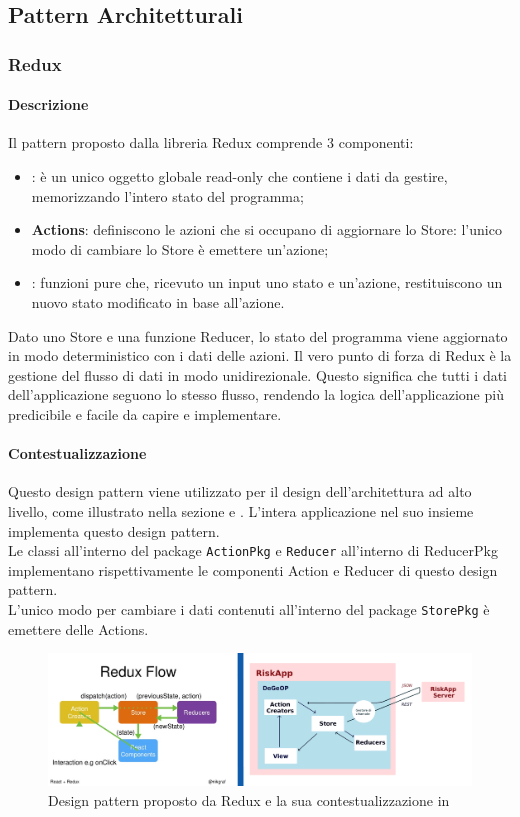 \newpage
\subsection{Pattern Architetturali}
\subsubsection{Redux}
\label{dp_redux} %
\paragraph{Descrizione}
Il pattern proposto dalla libreria Redux comprende 3 componenti:
\begin{itemize}
	\item \textbf{}: è un unico oggetto globale read-only che contiene i dati da gestire, memorizzando l'intero stato del programma;
	\item \textbf{Actions}: definiscono le azioni che si occupano di aggiornare lo Store: l'unico modo di cambiare lo Store è emettere un'azione;
	\item \textbf{}: funzioni pure che, ricevuto un input uno stato e un'azione, restituiscono un nuovo stato modificato in base all'azione.
\end{itemize}
Dato uno Store e una funzione Reducer, lo stato del programma viene aggiornato in modo deterministico con i dati delle azioni.
Il vero punto di forza di Redux è la gestione del flusso di dati in modo unidirezionale. Questo significa che tutti i dati dell'applicazione seguono lo stesso flusso, rendendo la logica dell'applicazione più predicibile e facile da capire e implementare.
\paragraph{Contestualizzazione}
Questo design pattern viene utilizzato per il design dell'architettura ad alto livello, come illustrato nella sezione  e . L'intera applicazione nel suo insieme implementa questo design pattern.
\\Le classi \texttt{} all'interno del package \texttt{ActionPkg} e \texttt{Reducer} all'interno di ReducerPkg implementano rispettivamente le componenti Action e Reducer di questo design pattern.
\\L'unico modo per cambiare i dati contenuti all'interno del package \texttt{StorePkg} è emettere delle Actions.
	\begin{figure}[H]
		\label{redux_compara}
		\centering
		\includegraphics[scale=0.3]{img/ComparaArch.png}
		\caption{Design pattern proposto da Redux e la sua contestualizzazione in \progetto}
	\end{figure}